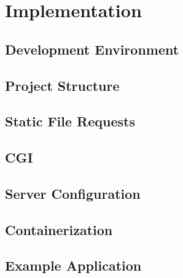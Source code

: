\section*{Implementation}

\subsection*{Development Environment}


\subsection*{Project Structure} %

\subsection*{Static File Requests}

\subsection*{CGI}

\subsection*{Server Configuration}

\subsection*{Containerization}

\subsection*{Example Application}
